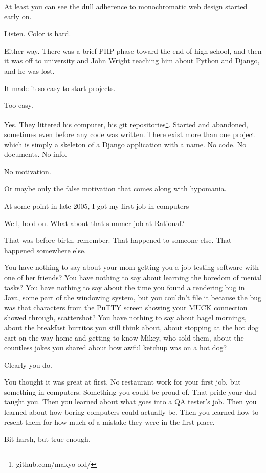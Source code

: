 \begin{paracol}{2}
\begin{leftcolumn}
\begin{ally}
At least you can see the dull adherence to monochromatic web design started early on.
\end{ally}
Listen. Color is hard.

Either way. There was a brief PHP phase toward the end of high school, and then it was off to university and John Wright teaching him about Python and Django, and he was lost.

It made it so easy to start projects.

\begin{ally}
Too easy.
\end{ally}
Yes. They littered his computer, his git repositories\footnote{github.com/makyo-old/}. Started and abandoned, sometimes even before any code was written. There exist more than one project which is simply a skeleton of a Django application with a name. No code. No documents. No info.

\begin{ally}
No motivation.
\end{ally}
Or maybe only the false motivation that comes along with hypomania.
\newpage

\noindent At some point in late 2005, I got my first job in computers--

\begin{ally}
Well, hold on. What about that summer job at Rational?
\end{ally}
That was before birth, remember. That happened to someone else. That happened somewhere else.

\begin{ally}
You have nothing to say about your mom getting you a job testing software with one of her friends? You have nothing to say about learning the boredom of menial tasks? You have nothing to say about the time you found a rendering bug in Java, some part of the windowing system, but you couldn't file it because the bug was that characters from the PuTTY screen showing your MUCK connection showed through, scattershot? You have nothing to say about bagel mornings, about the breakfast burritos you still think about, about stopping at the hot dog cart on the way home and getting to know Mikey, who sold them, about the countless jokes you shared about how awful ketchup was on a hot dog?
\end{ally}
Clearly you do.

\begin{ally}
You thought it was great at first. No restaurant work for your first job, but something in computers. Something you could be proud of. That pride your dad taught you. Then you learned about what goes into a QA tester's job. Then you learned about how boring computers could actually be. Then you learned how to resent them for how much of a mistake they were in the first place.
\end{ally}
Bit harsh, but true enough.


\end{leftcolumn}
\end{paracol}
